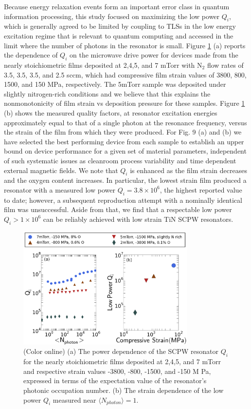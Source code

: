  Because energy relaxation events form an important error class in quantum information processing, this study focused on maximizing the low power $Q_{i}$, which is generally agreed to be limited by coupling to TLSs in the low energy excitation regime that is relevant to quantum computing and accessed in the limit where the number of photons in the resonator is small.  Figure \ref{QivsNp} (a) reports the dependence of $Q_{i}$ on the microwave drive power for devices made from the nearly stoichiometric films deposited at 2,4,5, and 7 mTorr with N$_{2}$ flow rates of 3.5, 3.5, 3.5, and 2.5 sccm, which had compressive film strain values of  3800, 800, 1500, and 150 MPa, respectively.  The 5mTorr sample was deposited under slightly nitrogen-rich conditions and we believe that this explains the nonmonotonicity of film strain vs deposition pressure for these samples.  Figure \ref{QivsNp} (b) shows the measured quality factors, at resonator excitation energies approximately equal to that of a single photon at the resonance frequency, versus the strain of the film from which they were produced.  For Fig. 9 (a) and (b) we have selected the best performing device from each sample to establish an upper bound on device performance for a  given set of material parameters, independent of such systematic issues as cleanroom process variability \cite{qiplotfn} and time dependent external magnetic fields.  We note that $Q_{i}$ is enhanced as the film strain decreases and the oxygen content increases.  In particular, the lowest strain film produced a resonator with a measured low power $Q_{i} = 3.8 \times 10^{6}$, the highest reported value to date; however,  a subsequent reproduction attempt with a nominally identical film was unsuccessful.  Aside from that, we find that a respectable low power $Q_{i} >1 \times 10^{6}$ can be reliably achieved with low strain TiN SCPW resonators.
 
\begin{figure}
\begin{center}
\includegraphics[width=89mm]{Qi-Np-Strain.jpg}
\end{center}

\caption{(Color online) (a) The power dependence of the SCPW resonator $Q_{i}$ for the nearly stoichiometric films deposited at 2,4,5, and 7 mTorr and respective strain values -3800, -800, -1500, and -150 M Pa, expressed in terms of the expectation value of the resonator's photonic occupation number.  (b) The strain dependence of the low power $Q_{i}$ measured near $\langle N_{photon}\rangle =1$.}
\label{QivsNp}
\end{figure}

